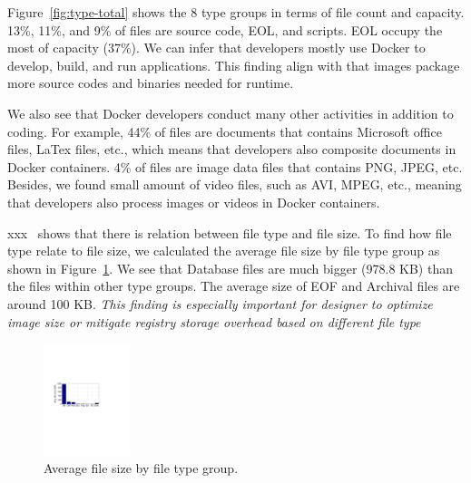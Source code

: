 Figure~\ref{fig:type-total} shows the 8 type groups in terms of file count and capacity.  
13\%, 11\%, and 9\% of files are source code, EOL, and scripts. 
EOL occupy the most of capacity (37\%). 
We can infer that developers mostly use Docker to develop, build, and run applications. This finding align with that images package more source codes and binaries needed for runtime.

We also see that Docker developers conduct many other activities in addition to coding. 
For example, 44\% of files are documents that contains Microsoft office files, LaTex files, etc., which means that developers also composite documents in Docker containers. 4\% of files are image data files that contains PNG, JPEG, etc. Besides, we found small amount of video files, such as AVI, MPEG, etc., meaning that developers also process images or videos in Docker containers.

xxx~\cite{xxxx} shows that there is relation between file type and file size. 
To find how file type relate to file size, we calculated the average file size by file type group as shown in
Figure~\ref{fig:type-total-avg-size}. We see that Database files are much bigger (978.8 KB) than the files within other type groups. The average size of EOF and Archival files are around 100 KB. 
\textit{This finding is especially important for designer to optimize image size or mitigate registry storage overhead based on different file type}


\begin{figure}[!t]
	\centering
	\includegraphics [width=0.225\textwidth]{graphs/type-total-avg-size}
	\caption{Average file size by file type group.}
	\label{fig:type-total-avg-size}
\end{figure}

